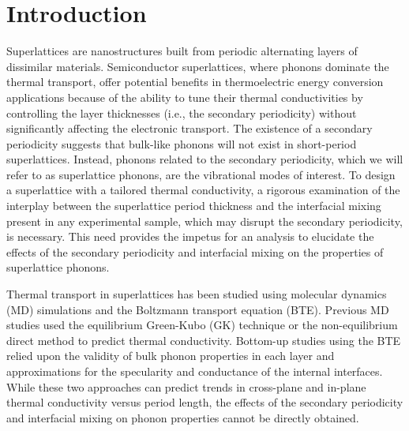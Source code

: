 \documentclass[aps,prb,preprint,preprintnumbers,amsmath,amssymb,floatfix,superscriptaddress]{revtex4}
\begin{document}
\section{Introduction}

Superlattices are nanostructures built from periodic alternating layers of dissimilar materials. Semiconductor superlattices, where phonons dominate the thermal transport, offer potential benefits in thermoelectric energy conversion applications because of the ability to tune their thermal conductivities by controlling the layer thicknesses (i.e., the secondary periodicity) without significantly affecting the electronic transport.\cite{broido1995effect,balandin2003mechanism,kim2006thermal} The existence of a secondary periodicity suggests that bulk-like phonons will not exist in short-period superlattices. Instead, phonons related to the secondary periodicity, which we will refer to as superlattice phonons, are the vibrational modes of interest. To design a superlattice with a tailored thermal conductivity, a rigorous examination of the interplay between the superlattice period thickness and the interfacial mixing present in any experimental sample, which may disrupt the secondary periodicity, is necessary. This need provides the impetus for an analysis to elucidate the effects of the secondary periodicity and interfacial mixing on the properties of superlattice phonons. 

Thermal transport in superlattices has been studied using molecular dynamics (MD) simulations and the Boltzmann transport equation (BTE). Previous MD studies used the equilibrium Green-Kubo (GK) \cite {PhysRevB.77.184302} technique or the non-equilibrium direct method \cite{PhysRevB.77.184302,PhysRevB.79.214307,PhysRevB.72.174302,PhysRevB.79.075316} to predict thermal conductivity. Bottom-up studies using the BTE relied upon the validity of bulk phonon properties in each layer\cite{walkauskas:2579,chen:220} and approximations for the specularity and conductance of the internal interfaces.\cite{PhysRevB.57.14958} While these two approaches can predict trends in cross-plane and in-plane thermal conductivity versus period length, the effects of the secondary periodicity and interfacial mixing on phonon properties cannot be directly obtained.
\end{document}
